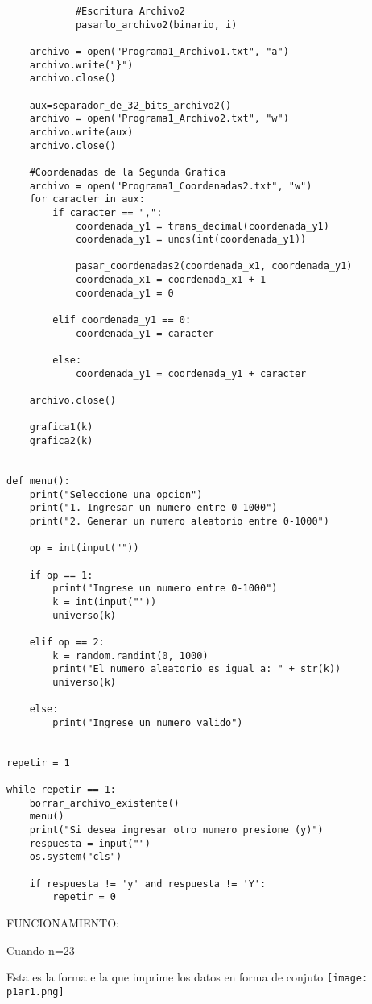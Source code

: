 \documentclass{article}
\begin{document}
\begin{flushleft}
\begin{lstlisting}
            #Escritura Archivo2
            pasarlo_archivo2(binario, i)
            
    archivo = open("Programa1_Archivo1.txt", "a")
    archivo.write("}")
    archivo.close()
    
    aux=separador_de_32_bits_archivo2()
    archivo = open("Programa1_Archivo2.txt", "w")
    archivo.write(aux)
    archivo.close()
    
    #Coordenadas de la Segunda Grafica
    archivo = open("Programa1_Coordenadas2.txt", "w")
    for caracter in aux:
        if caracter == ",":
            coordenada_y1 = trans_decimal(coordenada_y1)
            coordenada_y1 = unos(int(coordenada_y1))
            
            pasar_coordenadas2(coordenada_x1, coordenada_y1)
            coordenada_x1 = coordenada_x1 + 1
            coordenada_y1 = 0
        
        elif coordenada_y1 == 0:
            coordenada_y1 = caracter
            
        else:
            coordenada_y1 = coordenada_y1 + caracter
                
    archivo.close()
    
    grafica1(k)
    grafica2(k)


def menu():
    print("Seleccione una opcion")
    print("1. Ingresar un numero entre 0-1000")
    print("2. Generar un numero aleatorio entre 0-1000")

    op = int(input(""))

    if op == 1:
        print("Ingrese un numero entre 0-1000")
        k = int(input(""))
        universo(k)
        
    elif op == 2:
        k = random.randint(0, 1000)
        print("El numero aleatorio es igual a: " + str(k))
        universo(k)
        
    else:
        print("Ingrese un numero valido")


repetir = 1

while repetir == 1:
    borrar_archivo_existente()
    menu()
    print("Si desea ingresar otro numero presione (y)")
    respuesta = input("")
    os.system("cls")
    
    if respuesta != 'y' and respuesta != 'Y':
        repetir = 0 

\end{lstlisting}

FUNCIONAMIENTO:

Cuando n=23

Esta es la forma e la que imprime los datos en forma de conjuto
\texttt{[image: p1ar1.png]}


\end{flushleft}
\end{document}
